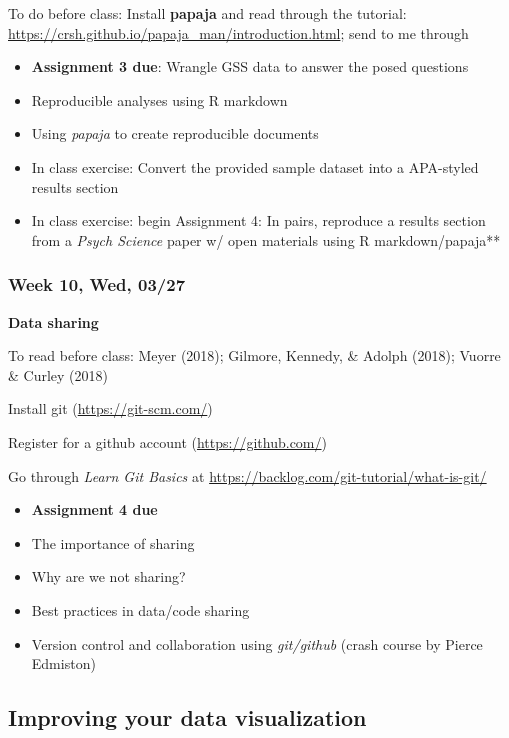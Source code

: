 \documentclass[11pt,man]{article}
\providecommand{\tightlist}{%
  \setlength{\itemsep}{0pt}\setlength{\parskip}{0pt}}
\begin{document}
To do before class: Install \textbf{papaja} and read through the
tutorial: \url{https://crsh.github.io/papaja_man/introduction.html};
send to me through

\begin{itemize}
\tightlist
\item
  \textbf{Assignment 3 due}: Wrangle GSS data to answer the posed
  questions
\item
  Reproducible analyses using R markdown
\item
  Using \emph{papaja} to create reproducible documents
\item
  In class exercise: Convert the provided sample dataset into a
  APA-styled results section
\item
  In class exercise: begin Assignment 4: In pairs, reproduce a results
  section from a \emph{Psych Science} paper w/ open materials using R
  markdown/papaja**
\end{itemize}

\subsubsection{Week 10, Wed, 03/27}\label{week-10-wed-0327}

\textbf{Data sharing}

To read before class: Meyer (2018); Gilmore, Kennedy, \& Adolph (2018);
Vuorre \& Curley (2018)

Install git (\url{https://git-scm.com/})

Register for a github account (\url{https://github.com/})

Go through \emph{Learn Git Basics} at
\url{https://backlog.com/git-tutorial/what-is-git/}

\begin{itemize}
\tightlist
\item
  \textbf{Assignment 4 due}
\item
  The importance of sharing
\item
  Why are we not sharing?
\item
  Best practices in data/code sharing
\item
  Version control and collaboration using \emph{git/github} (crash
  course by Pierce Edmiston)
\end{itemize}

\subsection{Improving your data
visualization}\label{improving-your-data-visualization}
\end{document}
